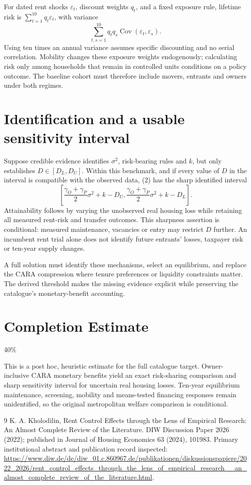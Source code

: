 \documentclass[11pt]{article}
\begin{document}
For dated rent shocks $\varepsilon_t$, discount weights $q_t$, and a fixed exposure rule, lifetime risk is $\sum_{t=1}^{10}q_t\varepsilon_t$, with variance
\[
 \sum_{t,s=1}^{10}q_tq_s\operatorname{Cov}(\varepsilon_t,\varepsilon_s).
\]
Using ten times an annual variance assumes specific discounting and no serial correlation. Mobility changes these exposure weights endogenously; calculating risk only among households that remain in controlled units conditions on a policy outcome. The baseline cohort must therefore include movers, entrants and owners under both regimes.

\section*{Identification and a usable sensitivity interval}
Suppose credible evidence identifies $\sigma^2$, risk-bearing rules and $k$, but only establishes $D\in[D_L,D_U]$. Within this benchmark, and if every value of $D$ in the interval is compatible with the observed data, (2) has the sharp identified interval
\[
 \left[\frac{\gamma_O+\gamma_P}{2}\sigma^2+k-D_U,
       \frac{\gamma_O+\gamma_P}{2}\sigma^2+k-D_L\right].
\]
Attainability follows by varying the unobserved real housing loss while retaining all measured rent-risk and transfer outcomes. This sharpness assertion is conditional: measured maintenance, vacancies or entry may restrict $D$ further. An incumbent rent trial alone does not identify future entrants' losses, taxpayer risk or ten-year supply changes.

A full solution must identify these mechanisms, select an equilibrium, and replace the CARA compression where tenure preferences or liquidity constraints matter. The derived threshold makes the missing evidence explicit while preserving the catalogue's monetary-benefit accounting.

\section{Completion Estimate}
40\%

This is a post hoc, heuristic estimate for the full catalogue target.
Owner-inclusive CARA monetary benefits yield an exact risk-sharing comparison and sharp sensitivity interval for uncertain real housing losses. Ten-year equilibrium maintenance, screening, mobility and means-tested financing responses remain unidentified, so the original metropolitan welfare comparison is conditional.

\begin{thebibliography}{9}
 K. A. Kholodilin, Rent Control Effects through the Lens of Empirical Research: An Almost Complete Review of the Literature. DIW Discussion Paper 2026 (2022); published in Journal of Housing Economics 63 (2024), 101983. Primary institutional abstract and publication record inspected:
\url{https://www.diw.de/de/diw_01.c.860967.de/publikationen/diskussionspapiere/2022_2026/rent_control_effects_through_the_lens_of_empirical_research__an_almost_complete_review_of_the_literature.html}.
\end{thebibliography}
\end{document}
